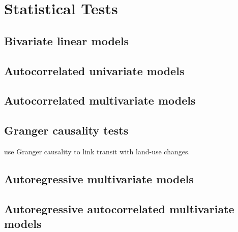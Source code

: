 \section{Statistical Tests}


\subsection{Bivariate linear models}

\subsection{Autocorrelated univariate models}

\subsection{Autocorrelated multivariate models}

\subsection{Granger causality tests}

\cite{xie2009streetcars} use Granger causality to link transit with land-use changes.


\subsection{Autoregressive multivariate models}



\subsection{Autoregressive autocorrelated multivariate models}









